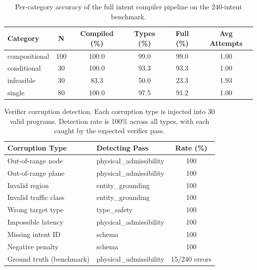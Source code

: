 \begin{table}[t]
\centering
\caption{Per-category accuracy of the full intent compiler pipeline on the 240-intent benchmark.}
\label{tab:category}
\begin{tabular}{lccccc}
\toprule
Category & N & Compiled (\%) & Types (\%) & Full (\%) & Avg Attempts \\
\midrule
compositional & 100 & 100.0 & 99.0 & 99.0 & 1.00 \\
conditional & 30 & 100.0 & 93.3 & 93.3 & 1.00 \\
infeasible & 30 & 83.3 & 50.0 & 23.3 & 1.93 \\
single & 80 & 100.0 & 97.5 & 91.2 & 1.00 \\
\bottomrule
\end{tabular}
\end{table}
\begin{table}[t]
\centering
\caption{Verifier corruption detection. Each corruption type is injected into 30 valid programs. Detection rate is 100\% across all types, with each caught by the expected verifier pass.}
\label{tab:verifier_audit}
\begin{tabular}{llc}
\toprule
Corruption Type & Detecting Pass & Rate (\%) \\
\midrule
Out-of-range node & physical\_admissibility & 100 \\
Out-of-range plane & physical\_admissibility & 100 \\
Invalid region & entity\_grounding & 100 \\
Invalid traffic class & entity\_grounding & 100 \\
Wrong target type & type\_safety & 100 \\
Impossible latency & physical\_admissibility & 100 \\
Missing intent ID & schema & 100 \\
Negative penalty & schema & 100 \\
\midrule
Ground truth (benchmark) & physical\_admissibility & 15/240 errors \\
\bottomrule
\end{tabular}
\end{table}

